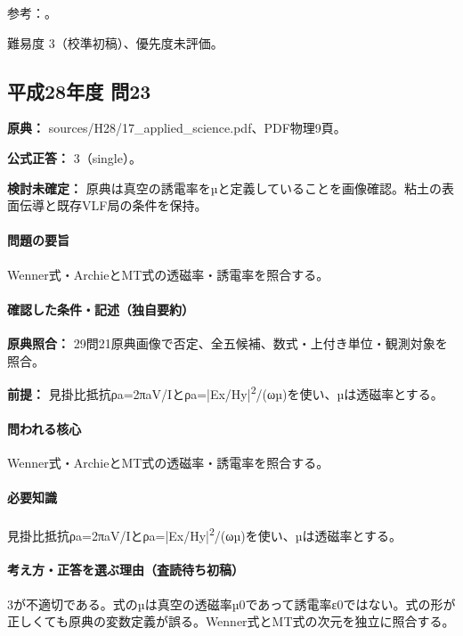 \par 参考：\cite{usgs_csamt2012,epa_ip,epa_tdem_archive,epa_borehole_resistivity}。

\par 難易度 3（校準初稿）、優先度未評価。

\subsection{平成28年度 問23}
\label{q:h28-reg-applied-23}

\noindent\textbf{原典：} sources/H28/17\_applied\_science.pdf、PDF物理9頁。

\textbf{公式正答：} 3（single）。

\par\textbf{検討未確定：} 原典は真空の誘電率をµと定義していることを画像確認。粘土の表面伝導と既存VLF局の条件を保持。

\paragraph{問題の要旨} Wenner式・ArchieとMT式の透磁率・誘電率を照合する。

\paragraph{確認した条件・記述（独自要約）}\mbox{}\par

\noindent\textbf{原典照合：} 29問21原典画像で否定、全五候補、数式・上付き単位・観測対象を照合。\par

\noindent\textbf{前提：} 見掛比抵抗ρa=\allowbreak{}2πaV/Iとρa=|Ex/Hy|\textsuperscript{2}/(ωµ)を使い、µは透磁率とする。\par

\paragraph{問われる核心} Wenner式・ArchieとMT式の透磁率・誘電率を照合する。

\paragraph{必要知識} 見掛比抵抗ρa=\allowbreak{}2πaV/Iとρa=|Ex/Hy|\textsuperscript{2}/(ωµ)を使い、µは透磁率とする。

\paragraph{考え方・正答を選ぶ理由（査読待ち初稿）} 3が不適切である。式のµは真空の透磁率µ0であって誘電率ε0ではない。式の形が正しくても原典の変数定義が誤る。Wenner式とMT式の次元を独立に照合する。

